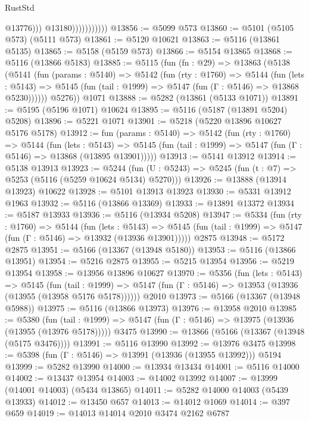 \begin{lexlean}{RustStd}
\begin{coremodule}
                                @13776)))
                          @13180)))))))))))
@13856 := @5099 @573
@13860 := @5101 (@5105 @573) (@5111 @573)
@13861 := @5120 @10621
@13863 := @5116 (@13861 @5135)
@13865 := @5158 (@5159 @573)
@13866 := @5154 @13865
@13868 := @5116 (@13866 @5183)
@13885 := @5115
    (fun (fn : @29) =>
    @13863
      (@5138
        (@5141
          (fun (params : @5140) =>
          @5142
            (fun (rty : @1760) =>
            @5144
              (fun (lets : @5143) =>
              @5145 (fun (tail : @1999) => @5147 (fun (Γ : @5146) => @13868 @5230))))))
        @5276))
    @1071
@13888 := @5282 (@13861 (@5133 @1071))
@13891 := @5195 (@5196 @1071) @10624
@13895 := @5116 (@5187 (@13891 @5204) @5208)
@13896 := @5221 @1071
@13901 := @5218 (@5220 @13896 @10627 @5176 @5178)
@13912 := fun (params : @5140) =>
  @5142
    (fun (rty : @1760) =>
    @5144
      (fun (lets : @5143) =>
      @5145 (fun (tail : @1999) => @5147 (fun (Γ : @5146) => @13868 (@13895 @13901)))))
@13913 := @5141 @13912
@13914 := @5138 @13913
@13923 := @5244
    (fun (U : @5243) => @5245 (fun (t : @7) => @5253 (@5116 (@5259 @10624 @5134) @5270)))
@13926 := @13888 (@13914 @13923) @10622
@13928 := @5101 @13913 @13923
@13930 := @5331 @13912 @1963
@13932 := @5116 (@13866 @13369)
@13933 := @13891 @13372
@13934 := @5187 @13933
@13936 := @5116 (@13934 @5208)
@13947 := @5334
    (fun (rty : @1760) =>
    @5144
      (fun (lets : @5143) =>
      @5145 (fun (tail : @1999) => @5147 (fun (Γ : @5146) => @13932 (@13936 @13901)))))
    @2875
@13948 := @5172 @2875
@13951 := @5166 (@13367 (@13948 @5180))
@13953 := @5116 (@13866 @13951)
@13954 := @5216 @2875
@13955 := @5215 @13954
@13956 := @5219 @13954
@13958 := @13956 @13896 @10627
@13970 := @5356
    (fun (lets : @5143) =>
    @5145
      (fun (tail : @1999) =>
      @5147 (fun (Γ : @5146) => @13953 (@13936 (@13955 (@13958 @5176 @5178))))))
    @2010
@13973 := @5166 (@13367 (@13948 @5988))
@13975 := @5116 (@13866 @13973)
@13976 := @13958 @2010
@13985 := @5380
    (fun (tail : @1999) => @5147 (fun (Γ : @5146) => @13975 (@13936 (@13955 (@13976 @5178)))))
    @3475
@13990 := @13866 (@5166 (@13367 (@13948 (@5175 @3476))))
@13991 := @5116 @13990
@13992 := @13976 @3475
@13998 := @5398 (fun (Γ : @5146) => @13991 (@13936 (@13955 @13992))) @5194
@13999 := @5282 @13990
@14000 := @13934 @13434
@14001 := @5116 @14000
@14002 := @13437 @13954
@14003 := @14002 @13992
@14007 := @13999 (@14001 @14003) (@5434 @13865)
@14011 := @5282 @14000 @14003 (@5439 @13933)
@14012 := @13450 @657
@14013 := @14012 @1069
@14014 := @397 @659
@14019 := @14013 @14014 @2010 @3474 @2162 @6787

\end{coremodule}
\end{lexlean}
